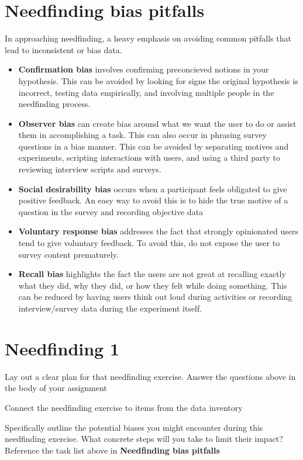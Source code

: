 \section{Needfinding bias pitfalls}

In approaching needfinding, a heavy emphasis on avoiding common pitfalls that lead to inconsistent or bias data.

\begin{itemize}
\item
  \textbf{Confirmation bias} involves confirming preconcieved notions in your hypothesis. This can be avoided by looking for signs the original hypothesis is incorrect, testing data empirically, and involving multiple people in the needfinding process.
\item
  \textbf{Observer bias} can create bias around what we want the user to do or assist them in accomplishing a task. This can also occur in phrasing survey questions in a bias manner. This can be avoided by separating motives and experiments, scripting interactions with users, and using a third party to reviewing interview scripts and surveys.
\item
  \textbf{Social desirability bias} occurs when a participant feels obligated to give positive feedback. An easy way to avoid this is to hide the true motive of a question in the survey and recording objective data
\item
  \textbf{Voluntary response bias} addresses the fact that strongly opinionated users tend to give voluntary feedback. To avoid this, do not expose the user to survey content prematurely.
\item
  \textbf{Recall bias} highlights the fact the users are not great at recalling exactly what they did, why they did, or how they felt while doing something. This can be reduced by having users think out loud during activities or recording interview/survey data during the experiment itself.
\end{itemize}


\section{Needfinding 1}
Lay out a clear plan for that needfinding exercise. Answer the questions above in the body of your assignment

Connect the needfinding exercise to items from the data inventory

Specifically outline the potential biases you might encounter during this needfinding exercise. What concrete steps will you take to limit their impact? Reference the task list above in \textbf{Needfinding bias pitfalls}

